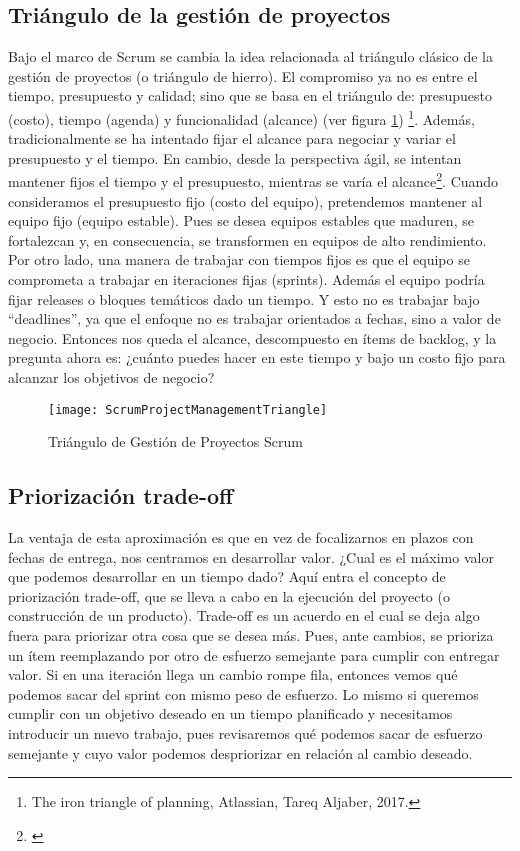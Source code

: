 \subsection{Triángulo de la gestión de proyectos}

Bajo el marco de Scrum se cambia la idea relacionada al triángulo clásico de la gestión de proyectos (o triángulo de hierro). El compromiso ya no es entre el tiempo, presupuesto y calidad; sino que se basa en el triángulo de: presupuesto (costo), tiempo (agenda) y funcionalidad (alcance) (ver figura \ref{fig:ScrumProjectManagementTriangle}) \footnote{The iron triangle of planning, Atlassian, Tareq Aljaber, 2017.}. Además, tradicionalmente se ha intentado fijar el alcance para negociar y variar el presupuesto y el tiempo. En cambio, desde la perspectiva ágil, se intentan mantener fijos el tiempo y el presupuesto, mientras se varía el alcance\footnote{\cite{Martin-Alaimo-2014}}. Cuando consideramos el presupuesto fijo (costo del equipo), pretendemos mantener al equipo fijo (equipo estable). Pues se desea equipos estables que maduren, se fortalezcan y, en consecuencia, se transformen en equipos de alto rendimiento. Por otro lado, una manera de trabajar con tiempos fijos es que el equipo se comprometa a trabajar en iteraciones fijas (sprints). Además el equipo podría fijar releases o bloques temáticos dado un tiempo. Y esto no es trabajar bajo “deadlines”, ya que el enfoque no es trabajar orientados a fechas, sino a valor de negocio. Entonces nos queda el alcance, descompuesto en ítems de backlog, y la pregunta ahora es: ¿cuánto puedes hacer en este tiempo y bajo un costo fijo para alcanzar los objetivos de negocio?

\begin{figure}[h]
  \centering
  \texttt{[image: ScrumProjectManagementTriangle]}
  \caption{Triángulo de Gestión de Proyectos Scrum}
  \centering
  \label{fig:ScrumProjectManagementTriangle} %
\end{figure}

\subsection{Priorización trade-off}

La ventaja de esta aproximación es que en vez de focalizarnos en plazos con fechas de entrega, nos centramos en desarrollar valor. ¿Cual es el máximo valor que podemos desarrollar en un tiempo dado? Aquí entra el concepto de priorización trade-off, que se lleva a cabo en la ejecución del proyecto (o construcción de un producto). Trade-off es un acuerdo en el cual se deja algo fuera para priorizar otra cosa que se desea más. Pues, ante cambios, se prioriza un ítem reemplazando por otro de esfuerzo semejante para cumplir con entregar valor. Si en una iteración llega un cambio rompe fila, entonces vemos qué podemos sacar del sprint con mismo peso de esfuerzo. Lo mismo si queremos cumplir con un objetivo deseado en un tiempo planificado y necesitamos introducir un nuevo trabajo, pues revisaremos qué podemos sacar de esfuerzo semejante y cuyo valor podemos despriorizar en relación al cambio deseado.

